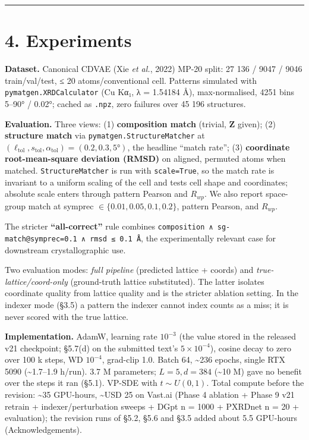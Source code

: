 \documentclass[
  11pt,
]{article}
\begin{document}
\begin{center}\rule{0.5\linewidth}{0.5pt}\end{center}

\section{4. Experiments}\label{experiments}

\textbf{Dataset.} Canonical CDVAE (Xie \emph{et al.}, 2022) MP-20 split:
27 136 / 9047 / 9046 train/val/test, ≤ 20 atoms/conventional cell.
Patterns simulated with \texttt{pymatgen.XRDCalculator} (Cu Kα₁, λ =
1.54184 Å), max-normalised, 4251 bins 5--90° / 0.02°; cached as
\texttt{.npz}, zero failures over 45 196 structures.

\textbf{Evaluation.} Three views: (1) \textbf{composition match}
(trivial, \(\mathbf{Z}\) given); (2) \textbf{structure match} via
\texttt{pymatgen.StructureMatcher} at
\((\ell_\text{tol}, s_\text{tol}, \alpha_\text{tol}) = (0.2, 0.3, 5°)\),
the headline ``match rate''; (3) \textbf{coordinate root-mean-square
deviation (RMSD)} on aligned, permuted atoms when matched.
\texttt{StructureMatcher} is run with \texttt{scale=True}, so the match
rate is invariant to a uniform scaling of the cell and tests cell shape
and coordinates; absolute scale enters through pattern Pearson and
\(R_{wp}\). We also report space-group match at symprec
\(\in \{0.01, 0.05, 0.1, 0.2\}\), pattern Pearson, and \(R_{wp}\).

The stricter \textbf{``all-correct''} rule combines
\texttt{composition\ ∧\ sg-match@symprec=0.1\ ∧\ rmsd\ ≤\ 0.1\ Å}, the
experimentally relevant case for downstream crystallographic use.

Two evaluation modes: \emph{full pipeline} (predicted lattice + coords)
and \emph{true-lattice/coord-only} (ground-truth lattice substituted).
The latter isolates coordinate quality from lattice quality and is the
stricter ablation setting. In the indexer mode (§3.5) a pattern the
indexer cannot index counts as a miss; it is never scored with the true
lattice.

\textbf{Implementation.} AdamW, learning rate \(10^{-3}\) (the value
stored in the released v21 checkpoint; §5.7(d) on the submitted text's
\(5\times10^{-4}\)), cosine decay to zero over 100 k steps, WD
\(10^{-4}\), grad-clip 1.0. Batch 64, \textasciitilde236 epochs, single
RTX 5090 (\textasciitilde1.7--1.9 h/run). 3.7 M parameters;
\(L = 5, d = 384\) (\textasciitilde10 M) gave no benefit over the steps
it ran (§5.1). VP-SDE with \(t \sim U(0,1)\). Total compute before the
revision: \textasciitilde35 GPU-hours, \textasciitilde USD 25 on Vast.ai
(Phase 4 ablation + Phase 9 v21 retrain + indexer/perturbation sweeps +
DGpt n = 1000 + PXRDnet n = 20 + evaluation); the revision runs of §5.2,
§5.6 and §3.5 added about 5.5 GPU-hours (Acknowledgements).
\end{document}
